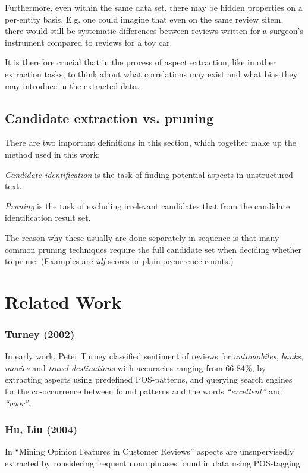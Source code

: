 \documentclass[a4paper,11pt]{kth-mag}
\begin{document}
Furthermore, even within the same data set, there may be hidden properties on a
per-entity basis. E.g. one could imagine that even on the same review sitem, there would still
be systematic differences between reviews written for a surgeon's instrument
compared to reviews for a toy car.

It is therefore crucial that in the process of aspect extraction, like in other extraction tasks,
to think about what correlations may exist and what bias they may introduce in the extracted data.


\subsection{Candidate extraction vs. pruning}
There are two important definitions in this section,
which together make up the method used in this work:

\emph{Candidate identification} is the task of finding potential aspects in unstructured text.

\emph{Pruning} is the task of excluding irrelevant candidates that from the candidate
identification result set.

The reason why these usually are done separately in sequence is that many common pruning
techniques require the full candidate set when deciding whether to prune.
(Examples are \emph{idf}-scores or plain occurrence counts.)


\section{Related Work}

\subsubsection{Turney (2002)}
In early work, Peter Turney classified sentiment of reviews for \emph{automobiles}, \emph{banks}, \emph{movies} and \emph{travel destinations} with accuracies ranging from 66-84\%, by extracting aspects using predefined POS-patterns, and querying search engines for the co-occurrence between found patterns and the words \emph{``excellent''} and \emph{``poor''}.

\subsubsection{Hu, Liu (2004)}
In ``Mining Opinion Features in Customer Reviews'' aspects are unsupervisedly
extracted by considering frequent noun phrases found in data using POS-tagging.
\end{document}
